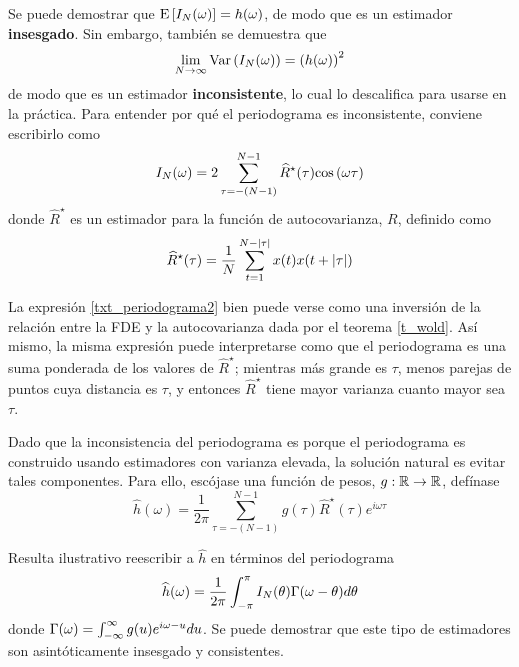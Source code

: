 Se puede demostrar que $\mathrm{E}\left[ I_N(\omega) \right] = h(\omega)$, de modo que es un estimador 
\textbf{insesgado}. Sin embargo, también se demuestra que
\begin{equation*}
\lim_{N\rightarrow \infty} \mathrm{Var}\left( I_N(\omega) \right) = \left( h(\omega) \right)^{2}
\end{equation*}
de modo que es un estimador \textbf{inconsistente}, lo cual lo descalifica para usarse en la 
práctica.
%
Para entender por qué el periodograma es inconsistente, conviene escribirlo como
\begin{equation}
I_N(\omega) = 2 \sum_{\tau = -(N-1)}^{N-1} \widehat{R}^{\star}(\tau) \mathrm{cos}\left( \omega \tau \right)
\label{txt_periodograma2}
\end{equation}
%
donde $\widehat{R}^{\star}$ es un estimador para la función de autocovarianza, $R$, definido como
\begin{equation}
\widehat{R}^{\star} (\tau) = \frac{1}{N} \sum_{t = 1}^{N-\left| \tau \right|} x(t) x(t+\left| \tau \right|)
\end{equation}

%
La expresión \ref{txt_periodograma2} bien puede verse como una inversión de la relación entre la
FDE y la autocovarianza dada por el teorema \ref{t_wold}.
%
Así mismo, la misma expresión puede interpretarse como que el periodograma es una suma ponderada de 
los valores de $\widehat{R}^{\star}$; mientras más grande es $\tau$, menos parejas de puntos cuya 
distancia es $\tau$, y entonces $\widehat{R}^{\star}$ tiene mayor varianza cuanto mayor sea $\tau$. 

Dado que la inconsistencia del periodograma es porque el periodograma es construido usando 
estimadores con varianza elevada, la solución natural es evitar tales componentes. Para ello, 
escójase una función de pesos, $g: \mathbb{R} \rightarrow \mathbb{R}$, defínase
%
\begin{equation}
\widehat{h}(\omega) = \frac{1}{2 \pi} \sum_{\tau = -(N-1)}^{N-1} g(\tau) \widehat{R}^{\star}(\tau) 
e^{i \omega \tau} 
\label{txt_estimador}
\end{equation}

Resulta ilustrativo reescribir a $\widehat{h}$ en términos del periodograma
\begin{equation*}
\widehat{h}(\omega) = \frac{1}{2 \pi} \int_{-\pi}^{\pi} I_N(\theta) \Gamma(\omega - \theta) d\theta
\end{equation*}
donde $\Gamma(\omega) = \int_{-\infty}^{\infty} g(u) e^{i \omega -u } du$.
%
Se puede demostrar que este tipo de estimadores son asintóticamente insesgado y consistentes.

